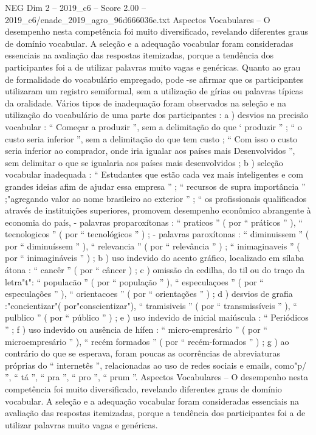 \begin{textsample}{NEG Dim 2 – 2019\_c6 – Score 2.00 – 2019\_c6/enade\_2019\_agro\_96d666036e.txt}
Aspectos Vocabulares – O desempenho nesta competência foi muito diversificado, revelando diferentes graus de domínio vocabular.
A seleção e a adequação vocabular foram consideradas essenciais na avaliação das respostas itemizadas, porque a tendência dos participantes foi a de utilizar palavras muito vagas e genéricas.
Quanto ao grau de formalidade do vocabulário empregado, pode -se afirmar que os participantes utilizaram um registro semiformal, sem a utilização de gírias ou palavras típicas da oralidade.
Vários tipos de inadequação foram observados na seleção e na utilização do vocabulário de uma parte dos participantes : a ) desvios na precisão vocabular : “ Começar a produzir ”, sem a delimitação do que ‘ produzir ” ; “ o custo seria inferior ”, sem a delimitação do que tem custo ; “ Com isso o custo seria inferior ao comprador, onde iria igualar aos países mais Desenvolvidos ”, sem delimitar o que se igualaria aos países mais desenvolvidos ; b ) seleção vocabular inadequada : “ Estudantes que estão cada vez mais inteligentes e com grandes ideias afim de ajudar essa empresa ” ; “ recursos de supra importância ” ;"agregando valor ao nome brasileiro ao exterior ” ; “ os profissionais qualificados através de instituições superiores, promovem desempenho econômico abrangente à economia do país, - palavras proparoxítonas : “ praticos ” ( por “ práticos ” ), “ tecnologicos ” ( por “ tecnológicos ” ) ; - palavras paroxítonas : “ diminuissem ” ( por “ diminuíssem ” ), “ relevancia ” ( por “ relevância ” ) ; “ inimaginaveis ” ( por “ inimagináveis ” ) ; b ) uso indevido do acento gráfico, localizado em sílaba átona : “ cancêr ” ( por “ câncer ) ; c ) omissão da cedilha, do til ou do traço da letra"t": “ populacão ” ( por “ população ” ), “ especulaçoes ” ( por “ especulações ” ), “ orientacoes ” ( por “ orientações ” ) ; d ) desvios de grafia :"concientizar"( por"conscientizar"), “ tramisiveis ” ( por “ transmissíveis ” ), “ pulblico ” ( por “ público ” ) ; e ) uso indevido de inicial maiúscula : “ Periódicos ” ; f ) uso indevido ou ausência de hífen : “ micro-empresário ” ( por “ microempresário ” ), “ recém formados ” ( por “ recém-formados ” ) ; g ) ao contrário do que se esperava, foram poucas as ocorrências de abreviaturas próprias do “ internetês ”, relacionadas ao uso de redes sociais e emails, como"p/ ”, “ tá ”, “ pra ”, “ pro ”, “ prum ”.
Aspectos Vocabulares – O desempenho nesta competência foi muito diversificado, revelando diferentes graus de domínio vocabular.
A seleção e a adequação vocabular foram consideradas essenciais na avaliação das respostas itemizadas, porque a tendência dos participantes foi a de utilizar palavras muito vagas e genéricas.

\end{textsample}

